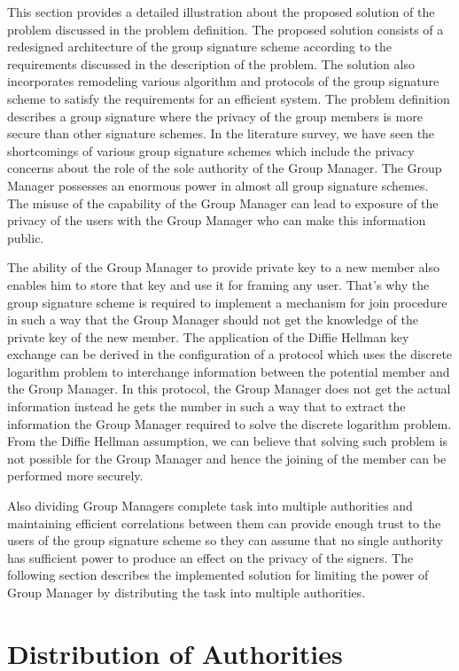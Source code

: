 This section provides a detailed illustration about the proposed solution of the problem discussed in the problem definition. The proposed solution consists of a redesigned architecture of the group signature scheme according to the requirements discussed in the description of the problem. The solution also incorporates remodeling various algorithm and protocols of the group signature scheme to satisfy the requirements for an efficient system. The problem definition describes a group signature where the privacy of the group members is more secure than other signature schemes. In the literature survey, we have seen the shortcomings of various group signature schemes which include the privacy concerns about the role of the sole authority of the Group Manager. The Group Manager possesses an enormous power in almost all group signature schemes. The misuse of the capability of the Group Manager can lead to exposure of the privacy of the users with the Group Manager who can make this information public.

The ability of the Group Manager to provide private key to a new member also enables him to store that key and use it for framing any user.  That's why the group signature scheme is required to implement a mechanism for join procedure in such a way that the Group Manager should not get the knowledge of the private key of the new member. The application of the Diffie Hellman key exchange can be derived in the configuration of a protocol which uses the discrete logarithm problem to interchange information between the potential member and the Group Manager. In this protocol, the Group Manager does not get the actual information instead he gets the number in such a way that to extract the information the Group Manager required to solve the discrete logarithm problem. From the Diffie Hellman assumption, we can believe that solving such problem is not possible for the Group Manager and hence the joining of the member can be performed more securely. 

Also dividing Group Managers complete task into multiple authorities and maintaining efficient correlations between them can provide enough trust to the users of the group signature scheme so they can assume that no single authority has sufficient power to produce an effect on the privacy of the signers. The following section describes the implemented solution for limiting the power of Group Manager by distributing the task into multiple authorities.

\section{Distribution of Authorities}

